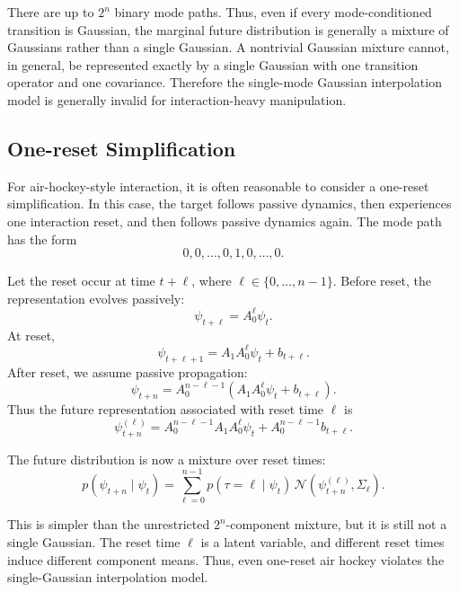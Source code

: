 There are up to \(2^n\) binary mode paths. Thus, even if every mode-conditioned transition is Gaussian, the marginal future distribution is generally a mixture of Gaussians rather than a single Gaussian. A nontrivial Gaussian mixture cannot, in general, be represented exactly by a single Gaussian with one transition operator and one covariance. Therefore the single-mode Gaussian interpolation model is generally invalid for interaction-heavy manipulation.

\subsection{One-reset Simplification}

For air-hockey-style interaction, it is often reasonable to consider a one-reset simplification. In this case, the target follows passive dynamics, then experiences one interaction reset, and then follows passive dynamics again. The mode path has the form
\[
0,0,\ldots,0,1,0,\ldots,0.
\]

Let the reset occur at time \(t+\ell\), where \(\ell\in\{0,\ldots,n-1\}\). Before reset, the representation evolves passively:
\begin{equation}
\psi_{t+\ell}
=
A_0^\ell\psi_t.
\end{equation}
At reset,
\begin{equation}
\psi_{t+\ell+1}
=
A_1A_0^\ell\psi_t
+
b_{t+\ell}.
\end{equation}
After reset, we assume passive propagation:
\begin{equation}
\psi_{t+n}
=
A_0^{n-\ell-1}
\left(
A_1A_0^\ell\psi_t
+
b_{t+\ell}
\right).
\end{equation}
Thus the future representation associated with reset time \(\ell\) is
\begin{equation}
\boxed{
\psi_{t+n}^{(\ell)}
=
A_0^{n-\ell-1}A_1A_0^\ell\psi_t
+
A_0^{n-\ell-1}b_{t+\ell}.
}
\end{equation}

The future distribution is now a mixture over reset times:
\begin{equation}
p(\psi_{t+n}\mid \psi_t)
=
\sum_{\ell=0}^{n-1}
p(\tau=\ell\mid \psi_t)
\,
\mathcal N
\left(
\psi_{t+n}^{(\ell)},\Sigma_\ell
\right).
\end{equation}

This is simpler than the unrestricted \(2^n\)-component mixture, but it is still not a single Gaussian. The reset time \(\ell\) is a latent variable, and different reset times induce different component means. Thus, even one-reset air hockey violates the single-Gaussian interpolation model.

